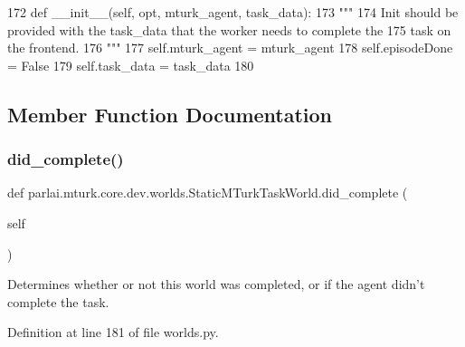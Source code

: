\begin{DoxyCode}
172     \textcolor{keyword}{def }\_\_init\_\_(self, opt, mturk\_agent, task\_data):
173         \textcolor{stringliteral}{"""}
174 \textcolor{stringliteral}{        Init should be provided with the task\_data that the worker needs to complete the}
175 \textcolor{stringliteral}{        task on the frontend.}
176 \textcolor{stringliteral}{        """}
177         self.mturk\_agent = mturk\_agent
178         self.episodeDone = \textcolor{keyword}{False}
179         self.task\_data = task\_data
180 
\end{DoxyCode}


\subsection{Member Function Documentation}
\mbox{\label{classparlai_1_1mturk_1_1core_1_1dev_1_1worlds_1_1StaticMTurkTaskWorld_a43d4e4711cd363ab8e018d856a4697e9}} 
\subsubsection{\texorpdfstring{did\+\_\+complete()}{did\_complete()}}
{\footnotesize\ttfamily def parlai.\+mturk.\+core.\+dev.\+worlds.\+Static\+M\+Turk\+Task\+World.\+did\+\_\+complete (\begin{DoxyParamCaption}\item[{}]{self }\end{DoxyParamCaption})}

\begin{DoxyVerb}Determines whether or not this world was completed, or if the agent didn't
complete the task.
\end{DoxyVerb}
 

Definition at line 181 of file worlds.\+py.


